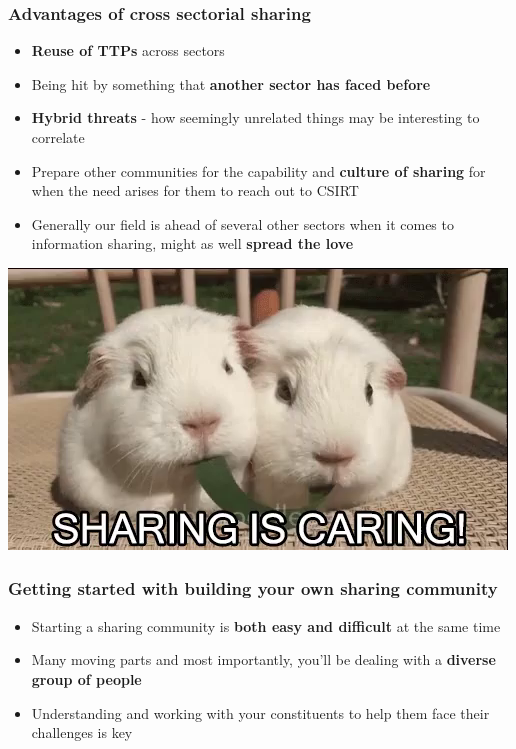 \begin{frame}
\frametitle{Advantages of cross sectorial sharing}
\begin{itemize}
	\item {\bf Reuse of TTPs} across sectors
	\item Being hit by something that {\bf another sector has faced before}
	\item {\bf Hybrid threats} - how seemingly unrelated things may be interesting to correlate
	\item Prepare other communities for the capability and {\bf culture of sharing} for when the need arises for them to reach out to CSIRT
	\item Generally our field is ahead of several other sectors when it comes to information sharing, might as well {\bf spread the love}
\end{itemize}
\includegraphics[scale=0.3]{screenshots/sharing.jpeg}
\end{frame}

\begin{frame}
\frametitle{Getting started with building your own sharing community}
\begin{itemize}
	\item Starting a sharing community is {\bf both easy and difficult} at the same time
    \item Many moving parts and most importantly, you'll be dealing with a {\bf diverse group of people}
	\item Understanding and working with your constituents to help them face their challenges is key
\end{itemize}
\end{frame}

